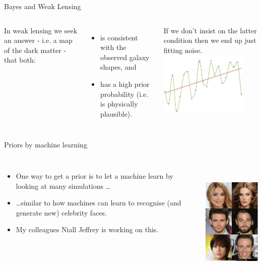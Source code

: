 \documentclass[usenames,dvipsnames]{beamer}
\begin{document}
\begin{frame}{Bayes and Weak Lensing}
  \begin{columns}
    In weak lensing we seek an answer - i.e. a map of the dark matter - that both:
      \begin{itemize}
        \item{is consistent with the observed galaxy shapes, and}
        \item{has a high prior probability (i.e. is physically plausible).}
      \end{itemize}
    If we don't insist on the latter condition then we end up just fitting noise.
    \centering
    \includegraphics[height=3cm]{diagram_5.png}
  \end{columns}
\end{frame}

\begin{frame}{Priors by machine learning}
  \begin{columns}
      \begin{itemize}
        \item{One way to get a prior is to let a machine learn by looking at many simulations \ldots}
        \item{\ldots similar to how machines can learn to recognise (and generate new) celebrity faces.}
        \item{My colleagues Niall Jeffrey is working on this.}
      \end{itemize}
    \centering
    \includegraphics[height=6cm]{diagram_6.png}
  \end{columns}
\end{frame}
\end{document}
